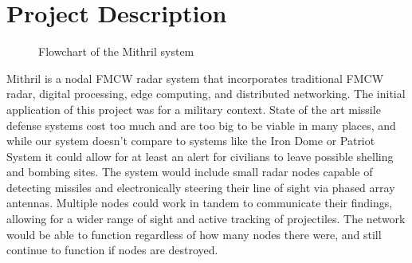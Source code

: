 \chapter{Project Description 
\label{Project Description}}
\begin{figure}[H]
  \centering
  \caption{Flowchart of the Mithril system}
  \label{fig:mithril_flowchart}
  \end{figure}
Mithril is a nodal FMCW radar system that incorporates traditional FMCW radar,
digital processing, edge computing, and distributed networking. The initial application of this project was for a military context.
State of the art missile defense systems cost too much and are too big to be viable in many places, and while our system doesn't compare to
systems like the Iron Dome or Patriot System it could allow for at least an alert for civilians to leave possible shelling and bombing sites.
The system would include small radar nodes capable of detecting missiles and electronically steering their line of sight via phased array antennas.
Multiple nodes could work in tandem to communicate their findings, allowing for a wider range of sight and active tracking of projectiles. The network would
be able to function regardless of how many nodes there were, and still continue to function if nodes are destroyed.

